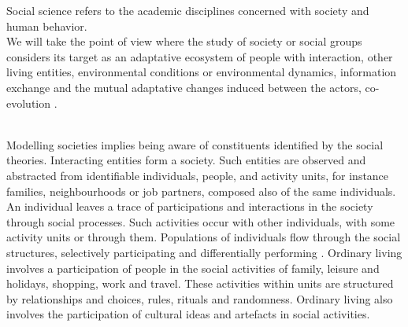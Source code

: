 \documentclass[11pt,oneside,a4paper,openright]{report}
\begin{document}
Social science refers to the academic disciplines concerned with society and human behavior\cite[p.7,chap.3]{MWilliams1999}.
\\
We will take the point of view where the study of society or social groups considers its target as an adaptative ecosystem of people with interaction, other living entities, environmental conditions or environmental dynamics, information exchange and the mutual adaptative changes induced between the actors, co-evolution \cite[p.4]{PerezAndBatten2006}.\\
\\
 
Modelling societies implies being aware of constituents identified by the social theories. Interacting entities form a society. Such entities are observed and abstracted from identifiable individuals, people, and activity units, for instance families, neighbourhoods or job partners, composed also of the same individuals. An individual leaves a trace of participations and interactions in the society through social processes. Such activities occur with other individuals, with some activity units or through them. Populations of individuals flow through the social structures, selectively participating and differentially performing \cite[p.8]{GordonBurt2010}. 
Ordinary living involves a participation of people in the social activities of family, leisure and holidays, shopping, work and travel. These activities within units are structured by relationships and choices, rules, rituals and randomness. Ordinary living also involves the participation of cultural ideas and artefacts in social activities.
\\ 
\end{document}
